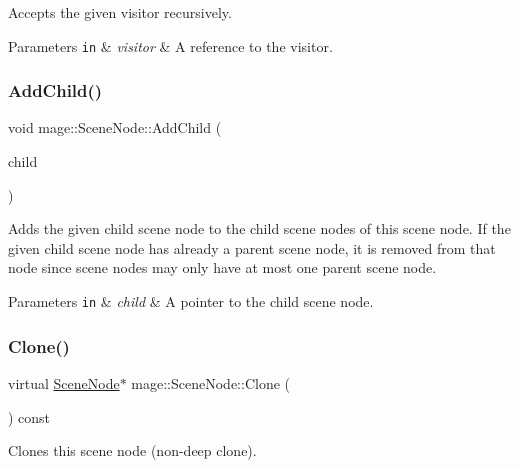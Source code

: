 Accepts the given visitor recursively.


\begin{DoxyParams}[1]{Parameters}
\mbox{\tt in}  & {\em visitor} & A reference to the visitor. \\
\hline
\end{DoxyParams}
\hypertarget{classmage_1_1_scene_node_ac07f89af783b1658a1f74205914f6fa3}{}\label{classmage_1_1_scene_node_ac07f89af783b1658a1f74205914f6fa3} 
\subsubsection{\texorpdfstring{Add\+Child()}{AddChild()}}
{\footnotesize\ttfamily void mage\+::\+Scene\+Node\+::\+Add\+Child (\begin{DoxyParamCaption}\item[{\hyperlink{classmage_1_1_scene_node}{Scene\+Node} $\ast$}]{child }\end{DoxyParamCaption})}

Adds the given child scene node to the child scene nodes of this scene node. If the given child scene node has already a parent scene node, it is removed from that node since scene nodes may only have at most one parent scene node.


\begin{DoxyParams}[1]{Parameters}
\mbox{\tt in}  & {\em child} & A pointer to the child scene node. \\
\hline
\end{DoxyParams}
\hypertarget{classmage_1_1_scene_node_a85d62213a900cd8e45864b8cde5929e9}{}\label{classmage_1_1_scene_node_a85d62213a900cd8e45864b8cde5929e9} 
\subsubsection{\texorpdfstring{Clone()}{Clone()}}
{\footnotesize\ttfamily virtual \hyperlink{classmage_1_1_scene_node}{Scene\+Node}$\ast$ mage\+::\+Scene\+Node\+::\+Clone (\begin{DoxyParamCaption}{ }\end{DoxyParamCaption}) const\hspace{0.3cm}{\ttfamily [pure virtual]}}

Clones this scene node (non-\/deep clone).

